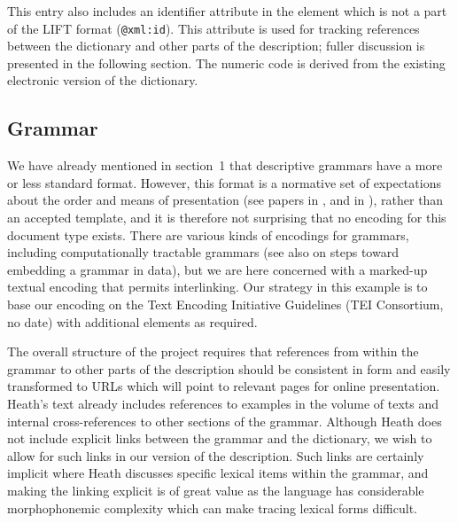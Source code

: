 This entry also includes an identifier attribute in the   element which is not a part of the LIFT format (\texttt{@xml:id}). This attribute is used for tracking references between the dictionary and other parts of the description; fuller discussion is presented in the following section. The numeric code is derived from the existing electronic version of the dictionary.

\subsection{Grammar}
We have already mentioned in section~1 that descriptive grammars have a more or less standard format. However, this format is a normative set of expectations about the order and means of presentation (see papers in \citet{EvansEtAl2006}, and in \citet{PayneEtAl2006}), rather than an accepted template, and it is therefore not surprising that no encoding for this document type exists. There are various kinds of encodings for grammars, including computationally tractable grammars (see also \citet[376]{Thieberger2009} on steps toward embedding a grammar in data), but we are here concerned with a marked-up textual encoding that permits interlinking. Our strategy in this example is to base our encoding on the Text Encoding Initiative Guidelines (TEI Consortium, no date) with additional elements as required.

The overall structure of the project requires that references from within the grammar to other parts of the description should be consistent in form and easily transformed to URLs which will point to relevant pages for online presentation. Heath's text already includes references to examples in the volume of texts and internal cross-references to other sections of the grammar. Although Heath does not include explicit links between the grammar and the dictionary, we wish to allow for such links in our version of the description. Such links are certainly implicit where Heath discusses specific lexical items within the grammar, and making the linking explicit is of great value as the language has considerable morphophonemic complexity which can make tracing lexical forms difficult. 


